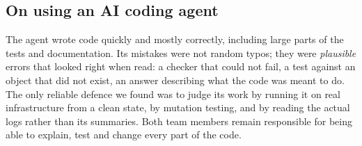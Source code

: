 \subsection{On using an AI coding agent}
The agent wrote code quickly and mostly correctly, including large parts of the tests and documentation. Its mistakes were not random typos; they were \emph{plausible} errors that looked right when read: a checker that could not fail, a test against an object that did not exist, an answer describing what the code was meant to do. The only reliable defence we found was to judge its work by running it on real infrastructure from a clean state, by mutation testing, and by reading the actual logs rather than its summaries. Both team members remain responsible for being able to explain, test and change every part of the code.
